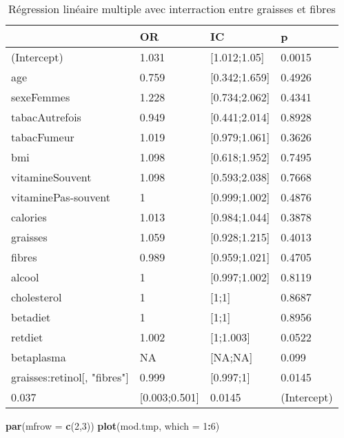 \documentclass[]{article}
\newenvironment{Shaded}{\begin{snugshade}}{\end{snugshade}}
\newcommand{\KeywordTok}[1]{\textcolor[rgb]{0.13,0.29,0.53}{\textbf{#1}}}
\newcommand{\DataTypeTok}[1]{\textcolor[rgb]{0.13,0.29,0.53}{#1}}
\newcommand{\DecValTok}[1]{\textcolor[rgb]{0.00,0.00,0.81}{#1}}
\newcommand{\OperatorTok}[1]{\textcolor[rgb]{0.81,0.36,0.00}{\textbf{#1}}}
\newcommand{\NormalTok}[1]{#1}
\begin{document}
\begin{table}

\caption{\label{tab:unnamed-chunk-89}Régression linéaire multiple avec interraction entre graisses et fibres}
\centering
\begin{tabular}[t]{l|l|l|l}
\hline
  & OR & IC & p\\
\hline
\rowcolor[HTML]{BBD2E1}  (Intercept) & 1.031 & [1.012;1.05] & 0.0015\\
\hline
age & 0.759 & [0.342;1.659] & 0.4926\\
\hline
\rowcolor[HTML]{BBD2E1}  sexeFemmes & 1.228 & [0.734;2.062] & 0.4341\\
\hline
tabacAutrefois & 0.949 & [0.441;2.014] & 0.8928\\
\hline
\rowcolor[HTML]{BBD2E1}  tabacFumeur & 1.019 & [0.979;1.061] & 0.3626\\
\hline
bmi & 1.098 & [0.618;1.952] & 0.7495\\
\hline
\rowcolor[HTML]{BBD2E1}  vitamineSouvent & 1.098 & [0.593;2.038] & 0.7668\\
\hline
vitaminePas-souvent & 1 & [0.999;1.002] & 0.4876\\
\hline
\rowcolor[HTML]{BBD2E1}  calories & 1.013 & [0.984;1.044] & 0.3878\\
\hline
graisses & 1.059 & [0.928;1.215] & 0.4013\\
\hline
\rowcolor[HTML]{BBD2E1}  fibres & 0.989 & [0.959;1.021] & 0.4705\\
\hline
alcool & 1 & [0.997;1.002] & 0.8119\\
\hline
\rowcolor[HTML]{BBD2E1}  cholesterol & 1 & [1;1] & 0.8687\\
\hline
betadiet & 1 & [1;1] & 0.8956\\
\hline
\rowcolor[HTML]{BBD2E1}  retdiet & 1.002 & [1;1.003] & 0.0522\\
\hline
betaplasma & NA & [NA;NA] & 0.099\\
\hline
\rowcolor[HTML]{BBD2E1}  graisses:retinol[, "fibres"] & 0.999 & [0.997;1] & 0.0145\\
\hline
0.037 & [0.003;0.501] & 0.0145 & (Intercept)\\
\hline
\end{tabular}
\end{table}

\begin{Shaded}
\begin{Highlighting}[]
\KeywordTok{par}\NormalTok{(}\DataTypeTok{mfrow =} \KeywordTok{c}\NormalTok{(}\DecValTok{2}\NormalTok{,}\DecValTok{3}\NormalTok{))}
\KeywordTok{plot}\NormalTok{(mod.tmp, }\DataTypeTok{which =} \DecValTok{1}\OperatorTok{:}\DecValTok{6}\NormalTok{)}
\end{Highlighting}
\end{Shaded}
\end{document}
